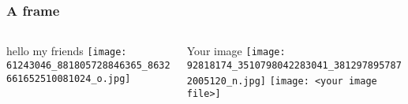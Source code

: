 \documentclass{beamer}
\begin{document}
\begin{frame}
\frametitle{A frame}
  \begin{columns}[T]
    \begin{column}{.5\textwidth}
     \begin{block}{ hello my friends}
\texttt{[image: 61243046\_881805728846365\_8632661652510081024\_o.jpg]}
    \end{block}
    \end{column}
    \begin{column}{.5\textwidth}
    \begin{block}{Your image}
\texttt{[image: 92818174\_3510798042283041\_3812978957872005120\_n.jpg]}
    \texttt{[image: <your image file>]}
    \end{block}
    \end{column}
  \end{columns}
\end{frame}
\end{document}
